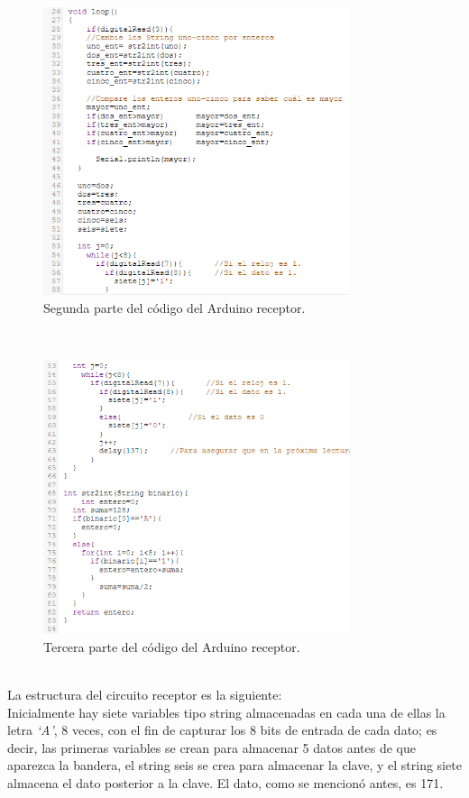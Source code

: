 \documentclass{article}
\begin{document}
\newpage
\begin{figure}[h]
\includegraphics[width=9cm]{codigo_receptor_2.PNG}
\centering
\caption{Segunda parte del código del Arduino receptor. }
\label{fig:codigo_receptor_2.PNG}
\end{figure}
\cite{completo}\\

\newpage

\begin{figure}[h]
\includegraphics[width=9cm]{codigo_receptor_3.PNG}
\centering
\caption{Tercera parte del código del Arduino receptor. }
\label{fig:codigo_receptor_3.PNG}
\end{figure}
\cite{completo}\\


La estructura del circuito receptor es la siguiente:\\

Inicialmente hay siete variables tipo string almacenadas en cada una de ellas la letra \textit{‘A’}, 8 veces, con el fin de capturar los 8 bits de entrada de cada dato; es decir, las primeras variables se crean para almacenar 5 datos antes de que aparezca la bandera, el string seis se crea para almacenar la clave, y el string siete almacena el dato posterior a la clave. El dato, como se mencionó antes, es 171. \\
\end{document}
